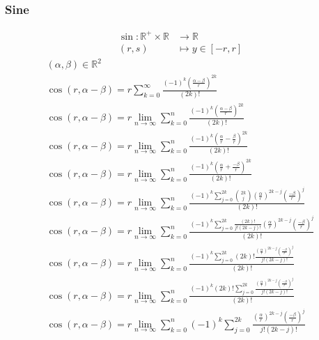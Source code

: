 \documentclass[a4paper,12pt]{report}
\begin{document}
\begin{landscape}
\subsubsection{Sine}
\begin{equation}
\begin{aligned}
\sin \colon \mathbb{R}^{+} \times \mathbb{R} & \to \mathbb{R} \\
(r,s) & \mapsto y \in [-r,r]
\end{aligned}
\end{equation}
{
\allowdisplaybreaks
\begin{gather}
(\alpha,\beta) \in \mathbb{R}^{2} \\
\cos(r,\alpha - \beta) = r \sum \limits_{k=0}^{\infty} \frac{(-1)^k \left(\frac{\alpha - \beta}{r}\right)^{2k}}{(2k)!} \\
\cos(r,\alpha - \beta) = r \lim \limits_{n \to \infty} \sum \limits_{k=0}^{n} \frac{(-1)^k \left(\frac{\alpha - \beta}{r}\right)^{2k}}{(2k)!} \\
\cos(r,\alpha - \beta) = r \lim \limits_{n \to \infty} \sum \limits_{k=0}^{n} \frac{(-1)^k \left(\frac{\alpha}{r} - \frac{\beta}{r}\right)^{2k}}{(2k)!} \\
\cos(r,\alpha - \beta) = r \lim \limits_{n \to \infty} \sum \limits_{k=0}^{n} \frac{(-1)^k \left(\frac{\alpha}{r} + \frac{-\beta}{r}\right)^{2k}}{(2k)!} \\
\cos(r,\alpha - \beta) = r \lim \limits_{n \to \infty} \sum \limits_{k=0}^{n} \frac{(-1)^k \sum \limits_{j=0}^{2k} \binom{2k}{j} \left(\frac{\alpha}{r}\right)^{2k-j} \left(\frac{-\beta}{r}\right)^{j}}{(2k)!} \\
\cos(r,\alpha - \beta) = r \lim \limits_{n \to \infty} \sum \limits_{k=0}^{n} \frac{(-1)^k \sum \limits_{j=0}^{2k} \frac{(2k)!}{j! (2k-j)!} \left(\frac{\alpha}{r}\right)^{2k-j} \left(\frac{-\beta}{r}\right)^{j}}{(2k)!} \\
\cos(r,\alpha - \beta) = r \lim \limits_{n \to \infty} \sum \limits_{k=0}^{n} \frac{(-1)^k \sum \limits_{j=0}^{2k} (2k)! \frac{\left(\frac{\alpha}{r}\right)^{2k-j} \left(\frac{-\beta}{r}\right)^{j}}{j! (2k-j)!}}{(2k)!} \\
\cos(r,\alpha - \beta) = r \lim \limits_{n \to \infty} \sum \limits_{k=0}^{n} \frac{(-1)^k (2k)! \sum \limits_{j=0}^{2k} \frac{\left(\frac{\alpha}{r}\right)^{2k-j} \left(\frac{-\beta}{r}\right)^{j}}{j! (2k-j)!}}{(2k)!} \\
\cos(r,\alpha - \beta) = r \lim \limits_{n \to \infty} \sum \limits_{k=0}^{n} (-1)^k \sum \limits_{j=0}^{2k} \frac{\left(\frac{\alpha}{r}\right)^{2k-j} \left(\frac{-\beta}{r}\right)^{j}}{j! (2k-j)!} \\

\end{gather}}
\end{landscape}
\end{document}
